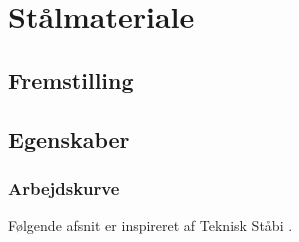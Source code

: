 \chapter{Stålmateriale}

\section{Fremstilling}

\section{Egenskaber}


\subsection{Arbejdskurve}

Følgende afsnit er inspireret af Teknisk Ståbi \citep{tekniskstaabi}.
